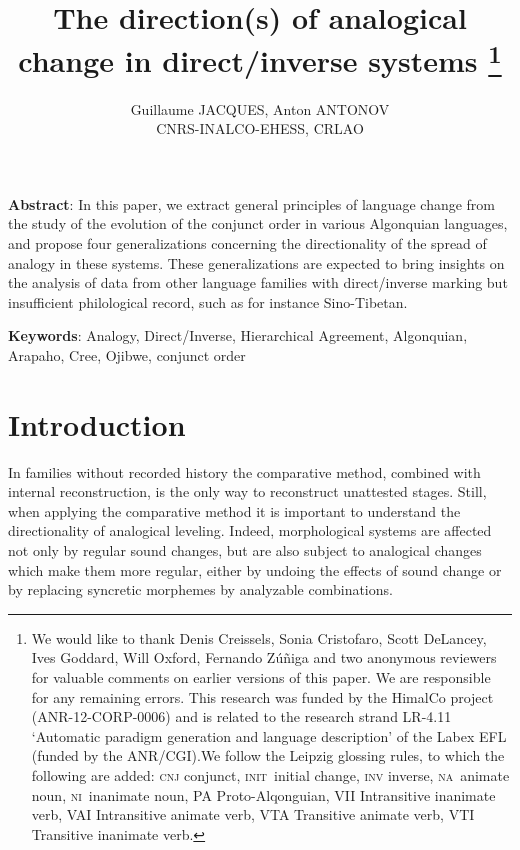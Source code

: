 \documentclass[twoside,a4paper,11pt]{article}
\newcommand{\Σ}{\greek{Σ}}
\newcommand{\init}{\textsc{init}}
\newcommand{\nanim}{\textsc{na}}
\newcommand{\ninan}{\textsc{ni}}
\begin{document}
\title{The direction(s) of analogical change in direct/inverse systems \footnote{We would like to thank Denis Creissels, Sonia Cristofaro, Scott DeLancey, Ives Goddard, Will Oxford, Fernando Zúñiga and two anonymous reviewers for valuable comments on earlier versions of this paper. We are responsible for any remaining errors. This research was funded by the HimalCo project (ANR-12-CORP-0006) and is related to the research strand LR-4.11 `Automatic paradigm generation and language description' of the Labex EFL (funded by the ANR/CGI).We follow the Leipzig glossing rules, to which the following are added: \textsc{cnj} conjunct, \init\ initial change, \textsc{inv} inverse, \nanim\ animate noun, \ninan\ inanimate noun, PA Proto-Alqonguian, VII Intransitive inanimate verb, VAI Intransitive animate verb, VTA Transitive animate verb, VTI Transitive inanimate verb.  } }

\author{Guillaume JACQUES, Anton ANTONOV\\ CNRS-INALCO-EHESS, CRLAO}
\maketitle

\textbf{Abstract}: In this paper, we extract general principles of language change from the study of the evolution of the conjunct order in various Algonquian languages, and propose four generalizations concerning the directionality of the spread of analogy in these systems. These generalizations are expected to bring insights on the analysis of data from other language families with direct/inverse marking but insufficient philological record, such as for instance Sino-Tibetan.

\textbf{Keywords}: Analogy, Direct/Inverse, Hierarchical Agreement, Algonquian, Arapaho, Cree, Ojibwe, conjunct order

 
\section{Introduction}
In families without recorded history the comparative method, combined with internal reconstruction, is the only way to reconstruct unattested stages. Still, when applying the comparative method it is important to understand the directionality of analogical leveling.  Indeed, morphological systems are affected not only by regular sound changes, but are also subject to analogical changes which make them more regular, either by undoing the effects of sound change or by replacing syncretic morphemes by analyzable combinations.
\end{document}
